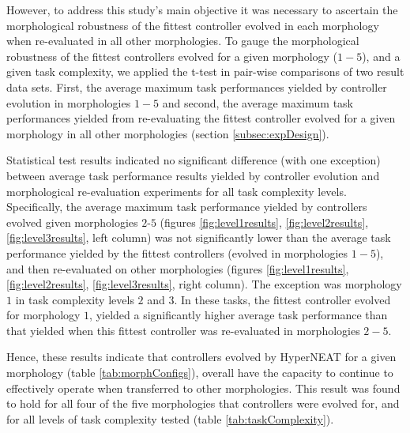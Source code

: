 \documentclass[conference]{IEEEtran}
\begin{document}
However, to address this study's main objective it was necessary to ascertain the morphological robustness
of the fittest controller evolved in each morphology when re-evaluated in all other morphologies.
To gauge the morphological robustness of the fittest controllers evolved for a given morphology ($1-5$),
and a given task complexity, we applied the t-test in pair-wise comparisons of two result
data sets.  First, the average maximum task performances yielded by controller evolution in morphologies
$1-5$ and second, the average maximum task performances yielded from re-evaluating the fittest controller
evolved for a given morphology in all other morphologies (section \ref{subsec:expDesign}).

Statistical test results indicated no significant difference (with one exception) between average task performance results
yielded by controller evolution and morphological re-evaluation experiments for all task complexity levels.
Specifically, the average maximum task performance yielded by controllers evolved given morphologies $2$-$5$
(figures \ref{fig:level1results}, \ref{fig:level2results}, \ref{fig:level3results}, left column) was not
significantly lower than the average task performance yielded by the fittest controllers
(evolved in morphologies $1-5$), and then re-evaluated on other morphologies
(figures \ref{fig:level1results}, \ref{fig:level2results}, \ref{fig:level3results},
right column).  The exception was morphology $1$ in task complexity levels $2$ and $3$.
In these tasks, the fittest controller evolved for morphology $1$, yielded a significantly higher average
task performance than that yielded when this fittest controller was re-evaluated in
morphologies $2-5$.

Hence, these results indicate that controllers evolved by HyperNEAT for a given morphology
(table \ref{tab:morphConfigs}), overall have the capacity to continue to effectively operate
when transferred to other morphologies.
This result was found to hold for all four of the five morphologies that controllers were evolved for,
and for all levels of task complexity tested (table \ref{tab:taskComplexity}).
\end{document}
